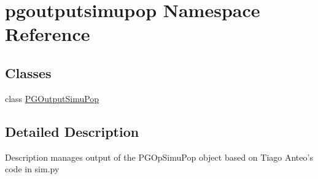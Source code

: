 \hypertarget{namespacepgoutputsimupop}{}\section{pgoutputsimupop Namespace Reference}
\label{namespacepgoutputsimupop}
\subsection*{Classes}
\begin{DoxyCompactItemize}
\item 
class \hyperlink{classpgoutputsimupop_1_1PGOutputSimuPop}{P\+G\+Output\+Simu\+Pop}
\end{DoxyCompactItemize}


\subsection{Detailed Description}
\begin{DoxyVerb}Description
manages output of the PGOpSimuPop object
based on Tiago Anteo's code in sim.py
\end{DoxyVerb}
 